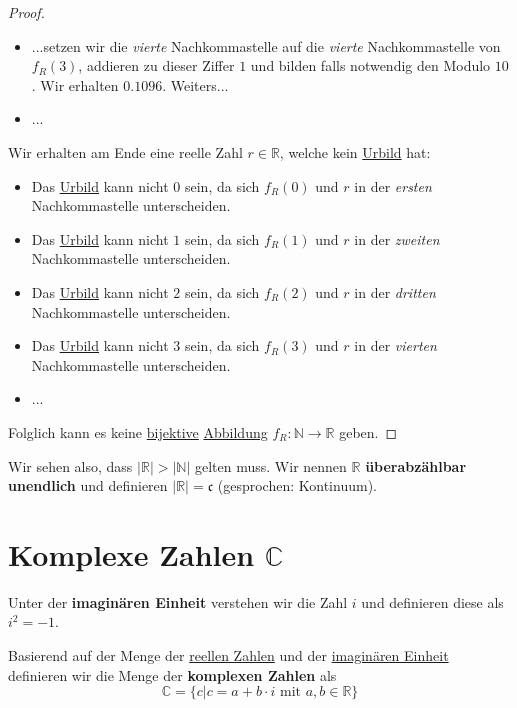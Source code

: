 \documentclass[../../main.tex]{subfiles}
\begin{document}
\begin{definition}
\begin{proof}
\begin{itemize}
					\item ...setzen wir die \textit{vierte} Nachkommastelle auf die \textit{vierte} Nachkommastelle von $f_R(3)$, addieren zu dieser Ziffer $1$ und bilden falls notwendig den Modulo $10$. Wir erhalten $0.1096$. Weiters...
					\item ...
				\end{itemize}
				Wir erhalten am Ende eine reelle Zahl $r \in \mathbb{R}$, welche kein \hyperref[def:Urbild]{Urbild} hat:
				\begin{itemize}
					\item Das \hyperref[def:Urbild]{Urbild} kann nicht $0$ sein, da sich $f_R(0)$ und $r$ in der \textit{ersten} Nachkommastelle unterscheiden.
					\item Das \hyperref[def:Urbild]{Urbild} kann nicht $1$ sein, da sich $f_R(1)$ und $r$ in der \textit{zweiten} Nachkommastelle unterscheiden.
					\item Das \hyperref[def:Urbild]{Urbild} kann nicht $2$ sein, da sich $f_R(2)$ und $r$ in der \textit{dritten} Nachkommastelle unterscheiden.
					\item Das \hyperref[def:Urbild]{Urbild} kann nicht $3$ sein, da sich $f_R(3)$ und $r$ in der \textit{vierten} Nachkommastelle unterscheiden.
					\item ...
				\end{itemize}
				Folglich kann es keine \hyperref[def:Bijektiv]{bijektive} \hyperref[def:Abbildung]{Abbildung} $f_R: \mathbb{N} \rightarrow \mathbb{R}$ geben.
			\end{proof}
			Wir sehen also, dass $|\mathbb{R}| > |\mathbb{N}|$ gelten muss. Wir nennen $\mathbb{R}$ \textbf{überabzählbar unendlich} und definieren $|\mathbb{R}| = \mathfrak{c}$ (gesprochen: Kontinuum).
		\end{definition}
		
		
		
		\section{Komplexe Zahlen $\mathbb{C}$}
			\begin{definition}
				\label{def:imaginäreEinheit}
				Unter der \textbf{imaginären Einheit} verstehen wir die Zahl $i$ und definieren diese als $i^2 = -1$. 
			\end{definition}
		
			\begin{definition}
				\label{def:KomplexeZahlen}
				Basierend auf der Menge der \hyperref[def:ReelleZahlen]{reellen Zahlen} und der \hyperref[def:imaginäreEinheit]{imaginären Einheit} definieren wir die Menge der \textbf{komplexen Zahlen} als $$\mathbb{C} = \{c | c = a + b \cdot i \text{ mit } a,b \in \mathbb{R} \}$$
			\end{definition}
		
\end{document}

